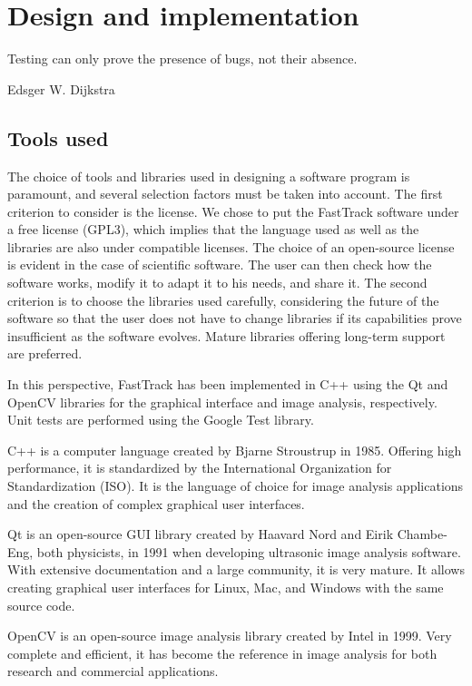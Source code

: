 \chapter{Design and implementation}

    \epigraph{Testing can only prove the presence of bugs, not their absence.}{Edsger W. Dijkstra}

	\section{Tools used}
	
	The choice of tools and libraries used in designing a software program is paramount, and several selection factors must be taken into account.
	The first criterion to consider is the license. We chose to put the FastTrack software under a free license (GPL3), which implies that the language used as well as the libraries are also under compatible licenses. The choice of an open-source license is evident in the case of scientific software. The user can then check how the software works, modify it to adapt it to his needs, and share it.
	The second criterion is to choose the libraries used carefully, considering the future of the software so that the user does not have to change libraries if its capabilities prove insufficient as the software evolves. Mature libraries offering long-term support are preferred.

	In this perspective, FastTrack has been implemented in C++ using the Qt \cite{Qt} and OpenCV \cite{opencv_library} libraries for the graphical interface and image analysis, respectively. Unit tests are performed using the Google Test library.

	C++ is a computer language created by Bjarne Stroustrup in 1985. Offering high performance, it is standardized by the International Organization for Standardization (ISO). It is the language of choice for image analysis applications and the creation of complex graphical user interfaces.

	Qt is an open-source GUI library created by Haavard Nord and Eirik Chambe-Eng, both physicists, in 1991 when developing ultrasonic image analysis software. With extensive documentation and a large community, it is very mature. It allows creating graphical user interfaces for Linux, Mac, and Windows with the same source code.

	OpenCV is an open-source image analysis library created by Intel in 1999. Very complete and efficient, it has become the reference in image analysis for both research and commercial applications.

